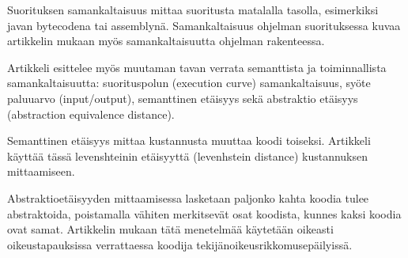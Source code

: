 \documentclass[finnish]{../tktltiki2}
\theoremstyle{definition}
\theoremstyle{remark}
\begin{document}
\begin{itemize}
Suorituksen samankaltaisuus mittaa suoritusta matalalla tasolla, esimerkiksi javan bytecodena tai assemblynä. Samankaltaisuus ohjelman suorituksessa kuvaa artikkelin mukaan myös samankaltaisuutta ohjelman rakenteessa.

Artikkeli esittelee myös muutaman tavan verrata semanttista ja toiminnallista samankaltaisuutta: suorituspolun (execution curve) samankaltaisuus, syöte paluuarvo (input/output), semanttinen etäisyys sekä abstraktio etäisyys (abstraction equivalence distance).

Semanttinen etäisyys mittaa kustannusta muuttaa koodi toiseksi. Artikkeli käyttää tässä levenshteinin etäisyyttä (levenhstein distance) kustannuksen mittaamiseen.

Abstraktioetäisyyden mittaamisessa lasketaan paljonko kahta koodia tulee abstraktoida, poistamalla vähiten merkitsevät osat koodista, kunnes kaksi koodia ovat samat. Artikkelin mukaan tätä menetelmää käytetään oikeasti oikeustapauksissa verrattaessa koodija tekijänoikeusrikkomusepäilyissä.








\end{itemize}




%
%
% 
%







%
\end{document}
